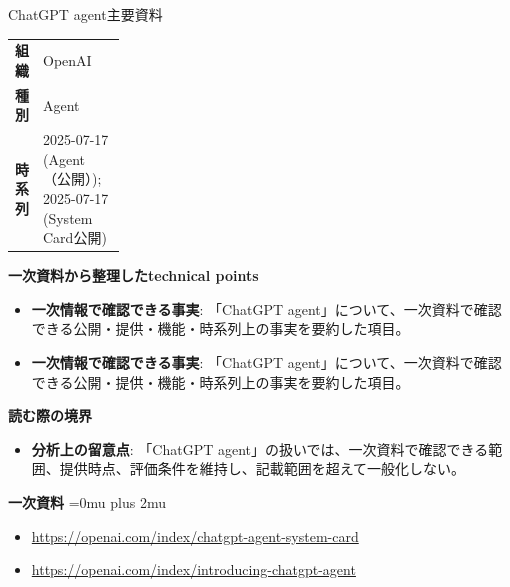 \begin{technicalnote}{ChatGPT agent}{主要資料}
\begingroup
\begin{tabularx}{\linewidth}{@{}>{\bfseries}p{0.22\linewidth}X@{}}
組織 & OpenAI \\
種別 & Agent \\
時系列 & 2025-07-17 (Agent（公開）); 2025-07-17 (System Card公開) \\
\end{tabularx}
\smallskip
{\bfseries 一次資料から整理したtechnical points}
\begin{itemize}[leftmargin=1.5em,itemsep=0.35em]
\item \textbf{一次情報で確認できる事実}: 「ChatGPT agent」について、一次資料で確認できる公開・提供・機能・時系列上の事実を要約した項目。
\item \textbf{一次情報で確認できる事実}: 「ChatGPT agent」について、一次資料で確認できる公開・提供・機能・時系列上の事実を要約した項目。
\end{itemize}
\begin{minipage}{\linewidth}
{\bfseries 読む際の境界}
\begin{itemize}[leftmargin=1.5em,itemsep=0.35em]
\item \textbf{分析上の留意点}: 「ChatGPT agent」の扱いでは、一次資料で確認できる範囲、提供時点、評価条件を維持し、記載範囲を超えて一般化しない。
\end{itemize}
\begin{samepage}
{\bfseries 一次資料}
\begingroup\sloppy
\Urlmuskip=0mu plus 2mu\relax
\begin{itemize}[leftmargin=1.5em,itemsep=0.25em]
\item {\scriptsize\url{https://openai.com/index/chatgpt-agent-system-card}}
\item {\scriptsize\url{https://openai.com/index/introducing-chatgpt-agent}}
\end{itemize}
\endgroup
\end{samepage}
\end{minipage}
\endgroup
\end{technicalnote}
\medskip

